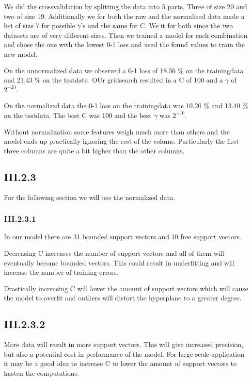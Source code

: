 \documentclass{article}
\begin{document}
We did the crossvalidation by splitting the data into 5 parts. Three of
size 20 and two of size 19. Additionally we for both the raw and the
normalised data made a list of size 7 for possible $\gamma$'s and the
same for C. We it for both since the two datasets are of very different
sizes. Then we trained a model for each combination and chose the one
with the lowest 0-1 loss and used the found values to train the new model.

On the unnormalized data we observed a 0-1 loss of 18.56 \% on the trainingdata
and 21.43 \% on the testdata. OUr gridsearch resulted in a C of 100 and
a $\gamma$  of $2^{-20}$. 

On the normalized data the 0-1 loss on the trainingdata was 10.20 \%
and 13.40 \% on the testdata. The best C was 100 and the best
$\gamma$ was $2^{-10}$.

Without normalization some features weigh much more than others and the
model ends up practically ignoring the rest of the colums. Particularly
the first three columns are quite a bit higher than the other columns.

\subsection{III.2.3}
For the following section we will use the normalized data.

\subsubsection{III.2.3.1}
In our model there are 31 bounded support vectors and 10 free support
vectors. 

Decreasing C increases the number of support vectors and all of
them will eventually become bounded vectors. This could result in
underfitting and will increase the number of training errors.

Drastically increasing C will lower the amount of support vectors which
will cause the model to overfit and outliers will distort the hyperplane
to a greater degree.


\subsection{III.2.3.2}

More data will result in more support vectors. This will give increased
precision, but also a potential cost in performance of the model. For
large scale application it may be a good idea to increase C to lower the
amount of support vectors to hasten the computations.
\end{document}
